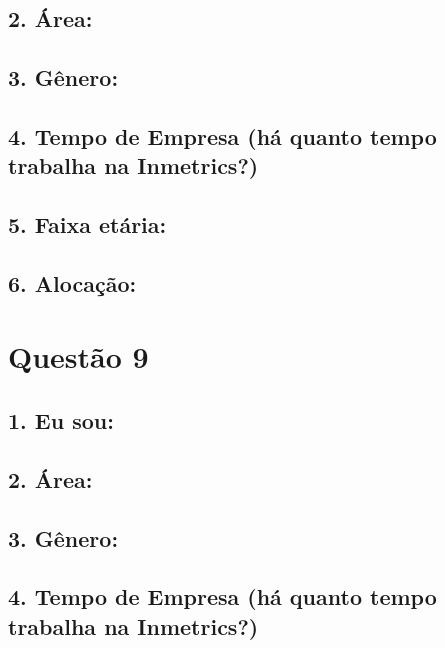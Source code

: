 \documentclass[]{book}
\begin{document}
\hypertarget{area-2}{%
\subsection{2. Área:}\label{area-2}}

\hypertarget{genero-2}{%
\subsection{3. Gênero:}\label{genero-2}}

\hypertarget{tempo-de-empresa-ha-quanto-tempo-trabalha-na-inmetrics-2}{%
\subsection{4. Tempo de Empresa (há quanto tempo trabalha na Inmetrics?)}\label{tempo-de-empresa-ha-quanto-tempo-trabalha-na-inmetrics-2}}

\hypertarget{faixa-etaria-2}{%
\subsection{5. Faixa etária:}\label{faixa-etaria-2}}

\hypertarget{alocacao-2}{%
\subsection{6. Alocação:}\label{alocacao-2}}

\hypertarget{questao-9}{%
\section{Questão 9}\label{questao-9}}

\hypertarget{eu-sou-3}{%
\subsection{1. Eu sou:}\label{eu-sou-3}}

\hypertarget{area-3}{%
\subsection{2. Área:}\label{area-3}}

\hypertarget{genero-3}{%
\subsection{3. Gênero:}\label{genero-3}}

\hypertarget{tempo-de-empresa-ha-quanto-tempo-trabalha-na-inmetrics-3}{%
\subsection{4. Tempo de Empresa (há quanto tempo trabalha na Inmetrics?)}\label{tempo-de-empresa-ha-quanto-tempo-trabalha-na-inmetrics-3}}
\end{document}
